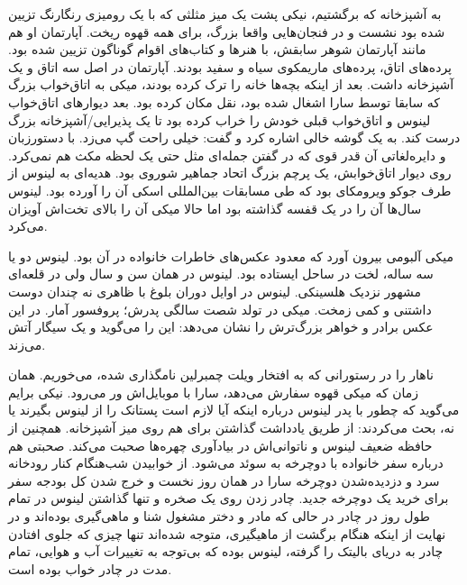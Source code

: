 \begin{journal}
به آشپزخانه که برگشتیم، نیکی پشت یک میز مثلثی که با یک رومیزی رنگارنگ
تزیین شده بود نشست و در فنجان‌هایی واقعا بزرگ، برای همه قهوه
ریخت. آپارتمان او هم مانند آپارتمان شوهر سابقش، با هنرها و کتاب‌های
اقوام گوناگون تزیین شده بود. پرده‌های اتاق، پرده‌های
ماریمکوی سیاه و سفید بودند. آپارتمان در اصل سه
اتاق و یک آشپزخانه داشت. بعد از اینکه بچه‌ها خانه را ترک کرده بودند،
میکی به اتاق‌خواب بزرگ که سابقا توسط سارا اشغال شده بود، نقل مکان کرده
بود. بعد دیوارهای اتاق‌خواب لینوس و اتاق‌خواب قبلی خودش را خراب کرده بود
تا یک پذیرایی/آشپزخانه بزرگ درست کند. به یک گوشه خالی اشاره کرد و گفت:
 خیلی
راحت گپ می‌زد. با دستورزبان و دایره‌لغاتی آن قدر قوی که در گفتن جمله‌ای
مثل  حتی یک لحظه
مکث هم نمی‌کرد. روی دیوار اتاق‌خوابش، یک پرچم بزرگ اتحاد جماهیر شوروی
بود. هدیه‌ای به لینوس از طرف جوکو ویرومکای
بود که طی مسابقات بین‌المللی اسکی آن را آورده بود. لینوس سال‌ها آن را در
یک قفسه گذاشته بود اما حالا میکی آن را بالای تخت‌اش آویزان می‌کرد.

میکی آلبومی بیرون آورد که معدود عکس‌های خاطرات خانواده در آن بود. لینوس
دو یا سه ساله، لخت در ساحل ایستاده بود. لینوس در همان سن و سال ولی در
قلعه‌ای مشهور نزدیک هلسینکی. لینوس در اوایل دوران بلوغ با ظاهری نه
چندان دوست داشتنی و کمی زمخت. میکی در تولد شصت سالگی پدرش؛ پروفسور
آمار. در این عکس برادر و خواهر بزرگ‌ترش را نشان می‌دهد:  این
را می‌گوید و یک سیگار آتش می‌زند.

ناهار را در رستورانی که به افتخار ویلت چمبرلین نامگذاری شده، می‌خوریم. همان زمان که میکی قهوه سفارش
می‌دهد، سارا با موبایل‌اش ور می‌رود. نیکی برایم می‌گوید که چطور با پدر
لینوس درباره اینکه آیا لازم است پستانک را از لینوس بگیرند یا نه، بحث
می‌کردند: از طریق یادداشت گذاشتن برای هم روی میز آشپزخانه. همچنین از
حافظه ضعیف لینوس و ناتوانی‌اش در بیادآوری چهره‌ها صحبت
می‌کند. 
صحبتی هم درباره سفر خانواده با دوچرخه به سوئد می‌شود. از خوابیدن
شب‌هنگام کنار رودخانه سرد و دزدیده‌شدن دوچرخه سارا در همان روز نخست و
خرج شدن کل بودجه سفر برای خرید یک دوچرخه جدید. چادر زدن روی یک صخره و
تنها گذاشتن لینوس در تمام طول روز در چادر در حالی که مادر و دختر مشغول
شنا و ماهی‌گیری بوده‌اند و در نهایت از اینکه هنگام برگشت از ماهیگیری،
متوجه شده‌اند تنها چیزی که جلوی افتادن چادر به دریای بالیتک را گرفته،
لینوس بوده که بی‌توجه به تغییرات آب و هوایی، تمام مدت در چادر خواب بوده
است.


\end{journal}
